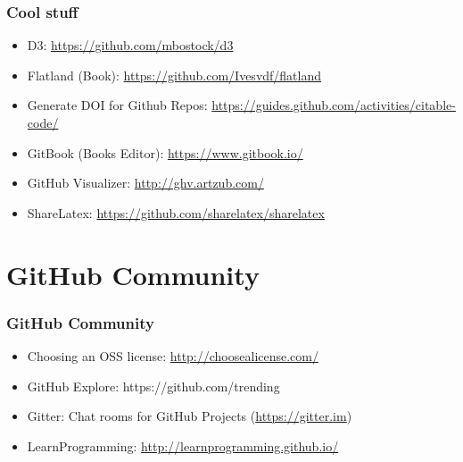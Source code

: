 \begin{frame}
    \frametitle{Cool stuff}
    
    \begin{itemize}
    \item D3: \url{https://github.com/mbostock/d3} \pause
    
    \item Flatland (Book): \url{https://github.com/Ivesvdf/flatland} \pause
    
    \item Generate DOI for Github Repos: \url{https://guides.github.com/activities/citable-code/} \pause 

    \item GitBook (Books Editor): \url{https://www.gitbook.io/} \pause
     
    \item GitHub Visualizer: \url{http://ghv.artzub.com/} \pause
       
    \item ShareLatex: \url{https://github.com/sharelatex/sharelatex}
    \end{itemize}
\end{frame}

\section[GitHub Community]{GitHub Community}
\begin{frame}
    \frametitle{GitHub Community}
    
    \begin{itemize}
    \item Choosing an OSS license: \url{http://choosealicense.com/} \pause
    
    \item GitHub Explore: https://github.com/trending \pause
    
    \item Gitter: Chat rooms for GitHub Projects (\url{https://gitter.im})
    
    \item LearnProgramming: \url{http://learnprogramming.github.io/}   
    
    \end{itemize}
\end{frame}

